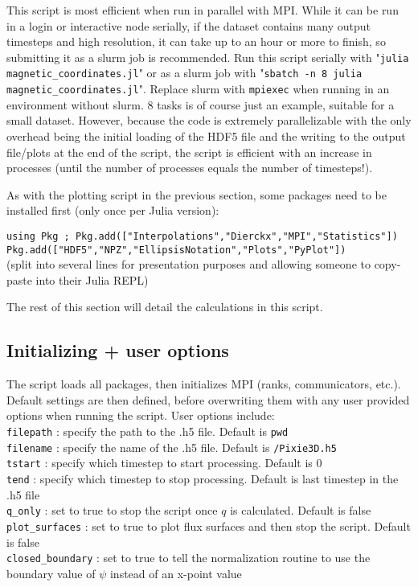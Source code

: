 \documentclass[12pt]{article}
\begin{document}
This script is most efficient when run in parallel with MPI.
While it can be run in a login or interactive node serially, if the dataset contains many output timesteps and high resolution, it can take up to an hour or more to finish, so submitting it as a slurm job is recommended.
Run this script serially with "\texttt{julia magnetic\_coordinates.jl}" or as a slurm job with "\texttt{sbatch -n 8 julia magnetic\_coordinates.jl}".
Replace slurm with \texttt{mpiexec} when running in an environment without slurm.
8 tasks is of course just an example, suitable for a small dataset.
However, because the code is extremely parallelizable with the only overhead being the initial loading of the HDF5 file and the writing to the output file/plots at the end of the script, the script is efficient with an increase in processes (until the number of processes equals the number of timesteps!).

As with the plotting script in the previous section, some packages need to be installed first (only once per Julia version):

\noindent \texttt{using Pkg ; Pkg.add(["Interpolations","Dierckx","MPI","Statistics"])}
\\
\texttt{Pkg.add(["HDF5","NPZ","EllipsisNotation","Plots","PyPlot"])}
\\
(split into several lines for presentation purposes and allowing someone to copy-paste into their Julia REPL)

The rest of this section will detail the calculations in this script.

\renewcommand{\thesubsection}{\arabic{subsection}}
\subsection{Initializing + user options}
The script loads all packages, then initializes MPI (ranks, communicators, etc.).
Default settings are then defined, before overwriting them with any user provided options when running the script.
User options include:
\\
\texttt{filepath} : specify the path to the .h5 file. Default is \texttt{pwd}
\\
\texttt{filename} : specify the name of the .h5 file. Default is \texttt{/Pixie3D.h5}
\\
\texttt{tstart} : specify which timestep to start processing. Default is 0
\\
\texttt{tend} : specify which timestep to stop processing. Default is last timestep in the .h5 file
\\
\texttt{q\_only} : set to true to stop the script once $q$ is calculated. Default is false
\\
\texttt{plot\_surfaces} : set to true to plot flux surfaces and then stop the script. Default is false
\\
\texttt{closed\_boundary} : set to true to tell the normalization routine to use the boundary value of $\psi$ instead of an x-point value
\end{document}
